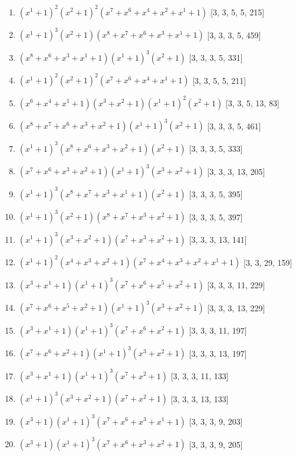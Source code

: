 \documentclass[10pt,twocolumn]{article}
\begin{document}
\begin{enumerate}
\item $(x^{1} + 1)^{2}(x^{2} + 1)^{2}(x^{7} + x^{6} + x^{4} + x^{2} + x^{1} + 1)$  [3, 3, 5, 5, 215]
\item $(x^{1} + 1)^{3}(x^{2} + 1)(x^{8} + x^{7} + x^{6} + x^{3} + x^{1} + 1)$  [3, 3, 3, 5, 459]
\item $(x^{8} + x^{6} + x^{3} + x^{1} + 1)(x^{1} + 1)^{3}(x^{2} + 1)$  [3, 3, 3, 5, 331]
\item $(x^{1} + 1)^{2}(x^{2} + 1)^{2}(x^{7} + x^{6} + x^{4} + x^{1} + 1)$  [3, 3, 5, 5, 211]
\item $(x^{6} + x^{4} + x^{1} + 1)(x^{3} + x^{2} + 1)(x^{1} + 1)^{2}(x^{2} + 1)$  [3, 3, 5, 13, 83]
\item $(x^{8} + x^{7} + x^{6} + x^{3} + x^{2} + 1)(x^{1} + 1)^{3}(x^{2} + 1)$  [3, 3, 3, 5, 461]
\item $(x^{1} + 1)^{3}(x^{8} + x^{6} + x^{3} + x^{2} + 1)(x^{2} + 1)$  [3, 3, 3, 5, 333]
\item $(x^{7} + x^{6} + x^{3} + x^{2} + 1)(x^{1} + 1)^{3}(x^{3} + x^{2} + 1)$  [3, 3, 3, 13, 205]
\item $(x^{1} + 1)^{3}(x^{8} + x^{7} + x^{3} + x^{1} + 1)(x^{2} + 1)$  [3, 3, 3, 5, 395]
\item $(x^{1} + 1)^{3}(x^{2} + 1)(x^{8} + x^{7} + x^{3} + x^{2} + 1)$  [3, 3, 3, 5, 397]
\item $(x^{1} + 1)^{3}(x^{3} + x^{2} + 1)(x^{7} + x^{3} + x^{2} + 1)$  [3, 3, 3, 13, 141]
\item $(x^{1} + 1)^{2}(x^{4} + x^{3} + x^{2} + 1)(x^{7} + x^{4} + x^{3} + x^{2} + x^{1} + 1)$  [3, 3, 29, 159]
\item $(x^{3} + x^{1} + 1)(x^{1} + 1)^{3}(x^{7} + x^{6} + x^{5} + x^{2} + 1)$  [3, 3, 3, 11, 229]
\item $(x^{7} + x^{6} + x^{5} + x^{2} + 1)(x^{1} + 1)^{3}(x^{3} + x^{2} + 1)$  [3, 3, 3, 13, 229]
\item $(x^{3} + x^{1} + 1)(x^{1} + 1)^{3}(x^{7} + x^{6} + x^{2} + 1)$  [3, 3, 3, 11, 197]
\item $(x^{7} + x^{6} + x^{2} + 1)(x^{1} + 1)^{3}(x^{3} + x^{2} + 1)$  [3, 3, 3, 13, 197]
\item $(x^{3} + x^{1} + 1)(x^{1} + 1)^{3}(x^{7} + x^{2} + 1)$  [3, 3, 3, 11, 133]
\item $(x^{1} + 1)^{3}(x^{3} + x^{2} + 1)(x^{7} + x^{2} + 1)$  [3, 3, 3, 13, 133]
\item $(x^{3} + 1)(x^{1} + 1)^{3}(x^{7} + x^{6} + x^{3} + x^{1} + 1)$  [3, 3, 3, 9, 203]
\item $(x^{3} + 1)(x^{1} + 1)^{3}(x^{7} + x^{6} + x^{3} + x^{2} + 1)$  [3, 3, 3, 9, 205]

\end{enumerate}
\end{document}
